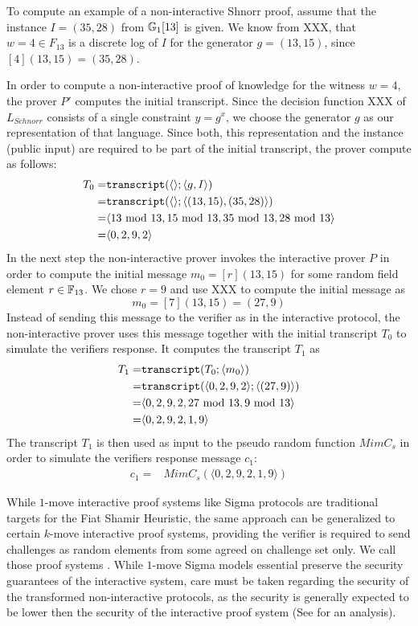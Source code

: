 \begin{example}
To compute an example of a non-interactive Shnorr proof, assume that the instance $I=(35,28)$ from $\mathbb{G}_1[13]$ is given. We know from XXX, that $w=4\in F_{13}$ is a discrete log of $I$ for the generator $g=(13,15)$, since $[4](13,15)=(35,28)$. 

In order to compute a non-interactive proof of knowledge for the witness $w=4$, the prover $P'$ computes the initial transcript. Since the decision function XXX of $L_{Schnorr}$ consists of a single constraint $y=g^x$, we choose the generator $g$ as our representation of that language. Since both, this representation and the instance (public input) are required to be part of the initial transcript, the prover compute as follows:
\begin{align*}
T_0 = & \mathtt{transcript}(\langle\rangle; \langle g,I\rangle) \\
    = & \mathtt{transcript}(\langle\rangle; \langle(13,15),(35,28)\rangle) \\
    = & \langle 13 \text{ mod } 13, 15 \text{ mod } 13,35 \text{ mod } 13,28 \text{ mod } 13 \rangle \\  
    = & \langle 0,2,9,2 \rangle
\end{align*}
In the next step the non-interactive prover invokes the interactive prover $P$ in order to compute the initial message $m_0=[r](13,15)$ for some random field element $r\in \mathbb{F}_{13}$. We chose $r=9$ and use XXX to compute the initial message as
$$
m_0 = [7](13,15) = (27,9)
$$
Instead of sending this message to the verifier as in the interactive protocol, the non-interactive prover uses this message together with the initial transcript $T_0$ to simulate the verifiers response. It computes the transcript $T_1$ as
\begin{align*}
T_1 = & \mathtt{transcript}(T_0; \langle m_0\rangle) \\
    = & \mathtt{transcript}(\langle 0,2,9,2\rangle; \langle(27,9)\rangle) \\
    = & \langle 0,2,9,2,27 \text{ mod } 13,9 \text{ mod } 13 \rangle \\  
    = & \langle 0,2,9,2,1,9 \rangle
\end{align*}
The transcript $T_1$ is then used as input to the pseudo random function $MimC_s$ in order to simulate the verifiers response message $c_1$:
\begin{align*}
c_1 = & MimC_s(\langle 0,2,9,2,1,9 \rangle)
\end{align*}
\end{example}


While $1$-move interactive proof systems like Sigma protocols are traditional targets for the Fiat Shamir Heuristic, the same approach can be generalized to certain $k$-move interactive proof systems, providing the verifier is required to send challenges as random elements from some agreed on challenge set only. We call those proof systems . While $1$-move Sigma models essential preserve the security guarantees of the interactive system, care must be taken regarding the security of the transformed non-interactive protocols, as the security is generally expected to be lower then the security of the interactive proof system (See \cite{attema-21} for an analysis). 

